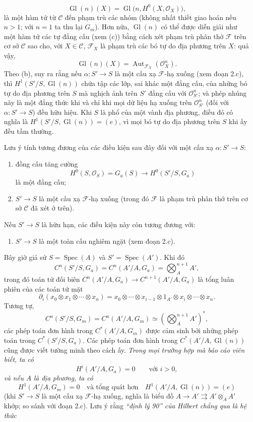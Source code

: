 \documentclass[11pt,twoside,openany]{book}
\numberwithin{equation}{section}
\newcommand{\src}[1]{%
  \phantomsection\hypertarget{src:\fgasourceid:#1}{}%
  \marginpar{\raggedleft\footnotesize\sffamily #1}%
}
\newcommand{\fgasourceid}{unset}
\begin{document}
\src{313}
\[
  \operatorname{Gl}(n)(X)=
  \operatorname{Gl}\bigl(n,H^0(X,\mathcal O_X)\bigr),
\]
là một hàm tử từ $\mathcal C$ đến phạm trù các nhóm (không nhất thiết giao
hoán nếu $n>1$; với $n=1$ ta thu lại $G_m$). Hơn nữa,
$\operatorname{Gl}(n)$ có thể được diễn giải như một hàm tử các tự đẳng cấu (xem
(c)) bằng cách xét phạm trù phân thớ $\mathcal F$ trên cơ sở $\mathcal C$ sao
cho, với $X\in\mathcal C$, $\mathcal F_X$ là phạm trù các bó tự do địa phương
trên $X$: quả vậy,
\[
  \operatorname{Gl}(n)(X)=
  \operatorname{Aut}_{\mathcal F_X}(\mathcal O_X^n).
\]
Theo (b), suy ra rằng nếu $\alpha:S'\longrightarrow S$ là một cấu xạ
$\mathcal F$-hạ xuống (xem đoạn 2.c), thì
$H^1(S'/S,\operatorname{Gl}(n))$ chứa tập các lớp, sai khác một đẳng cấu, của
những bó tự do địa phương trên $S$ mà nghịch ảnh trên $S'$ đẳng cấu với
$\mathcal O_{S'}^n$; và phép nhúng này là một đẳng thức khi và chỉ khi mọi dữ
liệu hạ xuống trên $\mathcal O_{S'}^n$ (đối với
$\alpha:S'\longrightarrow S$) đều hữu hiệu. Khi $S$ là phổ của một vành địa
phương, điều đó có nghĩa là
$H^1(S'/S,\operatorname{Gl}(n))=(e)$, vì mọi bó tự do địa phương trên $S$ khi
ấy đều tầm thường.

Lưu ý tính tương đương của các điều kiện sau đây đối với một cấu xạ
$\alpha:S'\longrightarrow S$:
\begin{enumerate}
\item[(i)] đồng cấu tăng cường
\[
  H^0(S,\mathcal O_S)=G_a(S)\longrightarrow H^0(S'/S,G_a)
\]
là một đẳng cấu;
\item[(ii)] $S'\longrightarrow S$ là một cấu xạ $\mathcal F$-hạ xuống
(trong đó $\mathcal F$ là phạm trù phân thớ trên cơ sở $\mathcal C$ đã xét ở
trên).
\end{enumerate}
Nếu $S'\longrightarrow S$ là hữu hạn, các điều kiện này còn tương đương với:
\begin{enumerate}
\item[(iii)] $S'\longrightarrow S$ là một toàn cấu nghiêm ngặt
(xem đoạn 2.c).
\end{enumerate}

Bây giờ giả sử $S=\operatorname{Spec}(A)$ và
$S'=\operatorname{Spec}(A')$. Khi đó
\[
  C^n(S'/S,G_a)=C^n(A'/A,G_a)=\bigotimes_A^{n+1}A',
\]
trong đó toán tử đối biên
$C^n(A'/A,G_a)\longrightarrow C^{n+1}(A'/A,G_a)$ là tổng luân phiên của các
toán tử mặt
\[
  \partial_i(x_0\otimes x_1\otimes\cdots\otimes x_n)
  =x_0\otimes\cdots\otimes x_{i-1}\otimes1_{A'}\otimes
   x_i\otimes\cdots\otimes x_n.
\]
Tương tự,
\[
  C^n(S'/S,G_m)=C^n(A'/A,G_m)
  \simeq\left(\bigotimes_A^{n+1}A'\right)^*,
\]
các phép toán đơn hình trong $C^*(A'/A,G_m)$ được cảm sinh bởi những phép toán
trong $C^*(S'/S,G_a)$. Các phép toán đơn hình trong
$C^*(A'/A,\operatorname{Gl}(n))$ cũng được viết tường minh theo cách ấy.
\emph{Trong mọi trường hợp mà báo cáo viên biết, ta có}
\[
  H^i(A'/A,G_a)=0\qquad\text{với $i>0$},
\]
\emph{và nếu $A$ là địa phương, ta có}
\[
  H^1(A'/A,G_m)=0
  \quad\text{và tổng quát hơn}\quad
  H^1(A'/A,\operatorname{Gl}(n))=(e)
\]
(khi $S'\longrightarrow S$ là một cấu xạ $\mathcal F$-hạ xuống, nghĩa là biểu
đồ
$A\longrightarrow A'\rightrightarrows A'\otimes_AA'$ khớp; so sánh với đoạn
2.c). Lưu ý rằng \emph{“định lý 90” của Hilbert chẳng qua là hệ thức}
\end{document}
